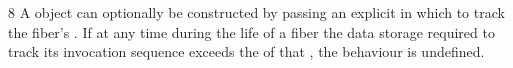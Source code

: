 

8 A \fiber object can optionally be constructed by passing an explicit
 in which to track the fiber's
. If at any time during the
life of a fiber the data storage required to track its invocation sequence
exceeds the  of that , the behaviour is undefined.



